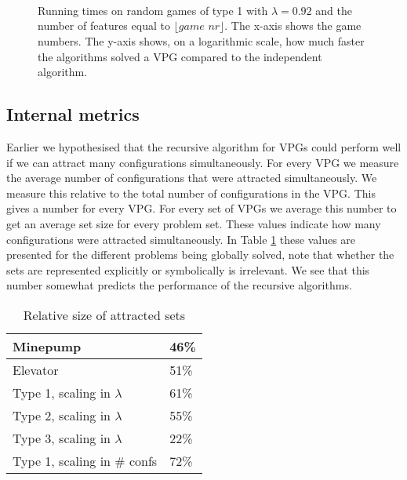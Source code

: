 \begin{figure}[H]
	\centering
	\begin{multicols}{2}
		\\\vfill
		\\
		\\\vfill
		
	\end{multicols}
	\caption{Running times on random games of type 1 with $\lambda = 0.92$ and the number of features equal to $\lfloor \textit{game nr}\rfloor$. The x-axis shows the game numbers. The y-axis shows, on a logarithmic scale, how much faster the algorithms solved a VPG compared to the independent algorithm.}
	\label{fig:results_scalegames}
\end{figure}%

\subsection{Internal metrics}
Earlier we hypothesised that the recursive algorithm for VPGs could perform well if we can attract many configurations simultaneously. For every VPG we measure the average number of configurations that were attracted simultaneously. We measure this relative to the total number of configurations in the VPG. This gives a number for every VPG. For every set of VPGs we average this number to get an average set size for every problem set. These values indicate how many configurations were attracted simultaneously. In Table \ref{tab_attracted_set_size} these values are presented for the different problems being globally solved, note that whether the sets are represented explicitly or symbolically is irrelevant. We see that this number somewhat predicts the performance of the recursive algorithms.

\begin{table}[h]
	\centering
	\begin{tabular}{|l|l|}
		\hline
		Minepump& 46\%\\ \hline
		Elevator& 51\%\\ \hline
		Type 1, scaling in $\lambda$& 61\%\\ \hline
		Type 2, scaling in $\lambda$& 55\%\\ \hline
		Type 3, scaling in $\lambda$& 22\%\\ \hline
		Type 1, scaling in \# confs& 72\%\\ \hline
	\end{tabular}
	\caption{Relative size of attracted sets}
	\label{tab_attracted_set_size}
\end{table}

